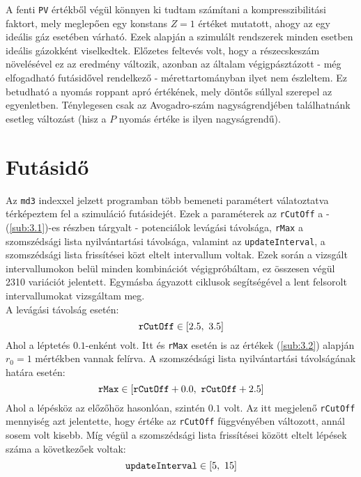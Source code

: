 \begin{multicols}{2}
A fenti \texttt{PV} értékből végül könnyen ki tudtam számítani a kompresszibilitási faktort, mely meglepően egy konstans $Z = 1$ értéket mutatott, ahogy az egy ideális gáz esetében várható. Ezek alapján a szimulált rendszerek minden esetben ideális gázokként viselkedtek. Előzetes feltevés volt, hogy a részecskeszám növelésével ez az eredmény változik, azonban az általam végigpásztázott - még elfogadható futásidővel rendelkező - mérettartományban ilyet nem észleltem. Ez betudható a nyomás roppant apró értékének, mely döntős súllyal szerepel az egyenletben. Ténylegesen csak az Avogadro-szám nagyságrendjében találhatnánk esetleg változást (hisz a $P$ nyomás értéke is ilyen nagyságrendű).

\section{Futásidő} \label{sec:6}
Az \texttt{md3} indexxel jelzett programban több bemeneti paramétert válatoztatva térképeztem fel a szimuláció futásidejét. Ezek a paraméterek az \texttt{rCutOff} a - (\ref{sub:3.1})-es részben tárgyalt - potenciálok levágási távolsága, \texttt{rMax} a szomszédsági lista nyilvántartási távolsága, valamint az \texttt{updateInterval}, a szomszédsági lista frissítései közt eltelt intervallum voltak. Ezek során a vizsgált intervallumokon belül minden kombinációt végigpróbáltam, ez összesen végül 2310 variációt jelentett. Egymásba ágyazott ciklusok segítségével a lent felsorolt intervallumokat vizsgáltam meg. \\
A levágási távolság esetén:
\begin{equation}
    \text{\texttt{rCutOff}} \in \left[ 2.5,\ 3.5 \right]
\end{equation}
Ahol a léptetés $0.1$-enként volt. Itt és \texttt{rMax} esetén is az értékek (\ref{sub:3.2}) alapján $r_{0} = 1$ mértékben vannak felírva. A szomszédsági lista nyilvántartási távolságának határa esetén:
\begin{equation}
    \text{\texttt{rMax}} \in \left[ \text{\texttt{rCutOff}} + 0.0,\ \text{\texttt{rCutOff}} + 2.5 \right]
\end{equation}
Ahol a lépésköz az előzőhöz hasonlóan, szintén $0.1$ volt. Az itt megjelenő \texttt{rCutOff} mennyiség azt jelentette, hogy értéke az \texttt{rCutOff} függvényében változott, annál sosem volt kisebb. Míg végül a szomszédsági lista frissítései között eltelt lépések száma a következőek voltak:
\begin{equation}
    \text{\texttt{updateInterval}} \in \left[ 5,\ 15 \right]

\end{equation}
\end{multicols}
